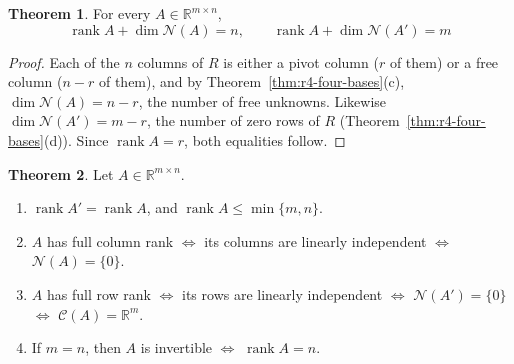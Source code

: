 \documentclass[12pt]{article}
\newcommand{\R}{\mathbb R}
\DeclareMathOperator{\rank}{rank}
\theoremstyle{definition}
\newtheorem{theorem}{Theorem}
\begin{document}
\begin{theorem}\label{thm:r4-rank-nullity}
For every \(A\in\R^{m\times n}\),
\[
\rank A+\dim\mathcal N(A)=n,\qquad\rank A+\dim\mathcal N(A')=m
\]
\end{theorem}
\begin{proof}
Each of the \(n\) columns of \(R\) is either a pivot column (\(r\) of them) or a free column
(\(n-r\) of them), and by Theorem~\ref{thm:r4-four-bases}(c), \(\dim\mathcal N(A)=n-r\), the number
of free unknowns. Likewise \(\dim\mathcal N(A')=m-r\), the number of zero rows of \(R\)
(Theorem~\ref{thm:r4-four-bases}(d)). Since \(\rank A=r\), both equalities follow.
\end{proof}

\begin{theorem}\label{thm:r4-rank-rules}
Let \(A\in\R^{m\times n}\).
\begin{enumerate}
\item \(\rank A'=\rank A\), and \(\rank A\leqslant\min\{m,n\}\).
\item \(A\) has full column rank \(\Leftrightarrow\) its columns are linearly independent
\(\Leftrightarrow\) \(\mathcal N(A)=\{0\}\).
\item \(A\) has full row rank \(\Leftrightarrow\) its rows are linearly independent
\(\Leftrightarrow\) \(\mathcal N(A')=\{0\}\) \(\Leftrightarrow\) \(\mathcal C(A)=\R^m\).
\item If \(m=n\), then \(A\) is invertible \(\Leftrightarrow\) \(\rank A=n\).
\end{enumerate}
\end{theorem}
\end{document}
